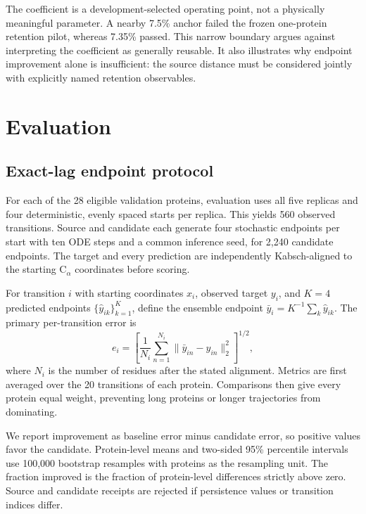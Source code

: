 \documentclass{article}
\newcommand{\CA}{C$_\alpha$}
\begin{document}
The coefficient is a development-selected operating point, not a physically meaningful parameter. A nearby 7.5\% anchor failed the frozen one-protein retention pilot, whereas 7.35\% passed. This narrow boundary argues against interpreting the coefficient as generally reusable. It also illustrates why endpoint improvement alone is insufficient: the source distance must be considered jointly with explicitly named retention observables.

\section{Evaluation}

\subsection{Exact-lag endpoint protocol}

For each of the 28 eligible validation proteins, evaluation uses all five replicas and four deterministic, evenly spaced starts per replica. This yields 560 observed transitions. Source and candidate each generate four stochastic endpoints per start with ten ODE steps and a common inference seed, for 2,240 candidate endpoints. The target and every prediction are independently Kabsch-aligned to the starting \CA{} coordinates before scoring.

For transition $i$ with starting coordinates $x_i$, observed target $y_i$, and $K = 4$ predicted endpoints $\{\hat{y}_{ik}\}_{k=1}^{K}$, define the ensemble endpoint $\bar{y}_i = K^{-1} \sum_k \hat{y}_{ik}$. The primary per-transition error is
\begin{equation}
  e_i = \left[ \frac{1}{N_i} \sum_{n=1}^{N_i} \lVert \bar{y}_{in} - y_{in} \rVert_2^2 \right]^{1/2},
\end{equation}
where $N_i$ is the number of residues after the stated alignment. Metrics are first averaged over the 20 transitions of each protein. Comparisons then give every protein equal weight, preventing long proteins or longer trajectories from dominating.

We report improvement as baseline error minus candidate error, so positive values favor the candidate. Protein-level means and two-sided 95\% percentile intervals use 100,000 bootstrap resamples with proteins as the resampling unit. The fraction improved is the fraction of protein-level differences strictly above zero. Source and candidate receipts are rejected if persistence values or transition indices differ.
\end{document}
